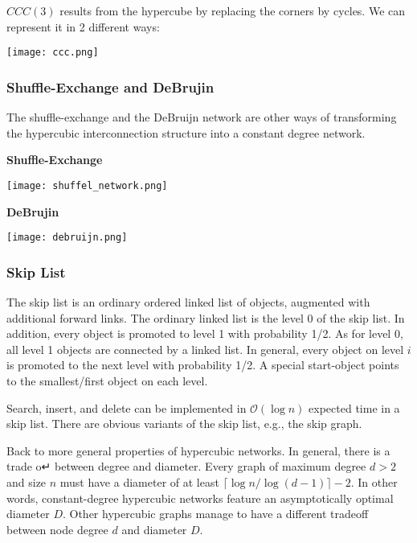$CCC(3)$ results from the hypercube by replacing the corners by cycles. We can represent it in 2 different ways:
\begin{center}
	\texttt{[image: ccc.png]}
\end{center}

\subsubsection{Shuffle-Exchange and DeBrujin}

The shuffle-exchange and the DeBruijn network are other ways of transforming the hypercubic interconnection structure into a constant degree network. \medskip

\textbf{Shuffle-Exchange}
\begin{center}
	\texttt{[image: shuffel\_network.png]}
\end{center}

\textbf{DeBrujin}
\begin{center}
	\texttt{[image: debruijn.png]}
\end{center}

\subsubsection{Skip List}

The skip list is an ordinary ordered linked list of objects, augmented with additional forward links. The ordinary linked list is the level 0 of the skip list. In addition, every object is promoted to level 1 with probability 1/2. As for level 0, all level 1 objects are connected by a linked list. In general, every object on level $i$ is promoted to the next level with probability 1/2. A special start-object points to the smallest/first object on each level. \medskip

Search, insert, and delete can be implemented in $\mathcal{O}(\log n)$ expected time in a skip list. There are obvious variants of the skip list, e.g., the skip graph. \medskip

Back to more general properties of hypercubic networks. In general, there is a trade o↵ between degree and diameter. Every graph of maximum degree $d > 2$ and size $n$ must have a diameter of at least $\lceil \log n / \log (d-1) \rceil -2$. In other words, constant-degree hypercubic networks feature an asymptotically optimal diameter $D$. Other hypercubic graphs manage to have a different tradeoff between node degree $d$ and diameter $D$.


